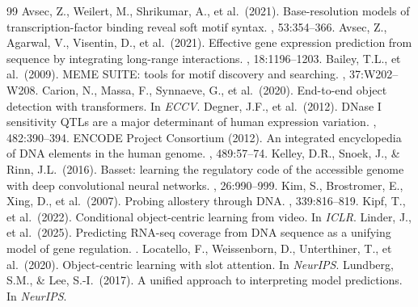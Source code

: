 \documentclass{article}
\begin{document}

\begin{thebibliography}{99}
\small
{}
Avsec, Z., Weilert, M., Shrikumar, A., et al.\ (2021).
\newblock Base-resolution models of transcription-factor binding reveal soft motif syntax.
, 53:354--366.
Avsec, Z., Agarwal, V., Visentin, D., et al.\ (2021).
\newblock Effective gene expression prediction from sequence by integrating long-range interactions.
, 18:1196--1203.
Bailey, T.L., et al.\ (2009).
\newblock MEME SUITE: tools for motif discovery and searching.
, 37:W202--W208.
Carion, N., Massa, F., Synnaeve, G., et al.\ (2020).
\newblock End-to-end object detection with transformers.
\newblock In {\em ECCV}.
Degner, J.F., et al.\ (2012).
\newblock DNase I sensitivity QTLs are a major determinant of human expression variation.
, 482:390--394.
ENCODE Project Consortium (2012).
\newblock An integrated encyclopedia of DNA elements in the human genome.
, 489:57--74.
Kelley, D.R., Snoek, J., \& Rinn, J.L.\ (2016).
\newblock Basset: learning the regulatory code of the accessible genome with deep convolutional neural networks.
, 26:990--999.
Kim, S., Brostromer, E., Xing, D., et al.\ (2007).
\newblock Probing allostery through DNA.
, 339:816--819.
Kipf, T., et al.\ (2022).
\newblock Conditional object-centric learning from video.
\newblock In {\em ICLR}.
Linder, J., et al.\ (2025).
\newblock Predicting RNA-seq coverage from DNA sequence as a unifying model of gene regulation.
.
Locatello, F., Weissenborn, D., Unterthiner, T., et al.\ (2020).
\newblock Object-centric learning with slot attention.
\newblock In {\em NeurIPS}.
Lundberg, S.M., \& Lee, S.-I.\ (2017).
\newblock A unified approach to interpreting model predictions.
\newblock In {\em NeurIPS}.

\end{thebibliography}
\end{document}
